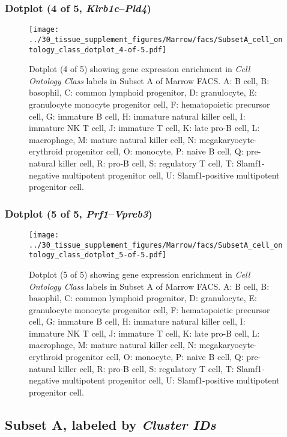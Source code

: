 \subsubsection{Dotplot (4 of 5, \emph{Klrb1c}--\emph{Pld4})}
\begin{figure}[h]
\centering
\texttt{[image: ../30\_tissue\_supplement\_figures/Marrow/facs/SubsetA\_cell\_ontology\_class\_dotplot\_4-of-5.pdf]}

\caption{ Dotplot (4 of 5)  showing gene expression enrichment in \emph{Cell Ontology Class} labels in Subset A of Marrow FACS. A: B cell, B: basophil, C: common lymphoid progenitor, D: granulocyte, E: granulocyte monocyte progenitor cell, F: hematopoietic precursor cell, G: immature B cell, H: immature natural killer cell, I: immature NK T cell, J: immature T cell, K: late pro-B cell, L: macrophage, M: mature natural killer cell, N: megakaryocyte-erythroid progenitor cell, O: monocyte, P: naive B cell, Q: pre-natural killer cell, R: pro-B cell, S: regulatory T cell, T: Slamf1-negative multipotent progenitor cell, U: Slamf1-positive multipotent progenitor cell.}
\end{figure}


\clearpage

\subsubsection{Dotplot (5 of 5, \emph{Prf1}--\emph{Vpreb3})}
\begin{figure}[h]
\centering
\texttt{[image: ../30\_tissue\_supplement\_figures/Marrow/facs/SubsetA\_cell\_ontology\_class\_dotplot\_5-of-5.pdf]}

\caption{ Dotplot (5 of 5)  showing gene expression enrichment in \emph{Cell Ontology Class} labels in Subset A of Marrow FACS. A: B cell, B: basophil, C: common lymphoid progenitor, D: granulocyte, E: granulocyte monocyte progenitor cell, F: hematopoietic precursor cell, G: immature B cell, H: immature natural killer cell, I: immature NK T cell, J: immature T cell, K: late pro-B cell, L: macrophage, M: mature natural killer cell, N: megakaryocyte-erythroid progenitor cell, O: monocyte, P: naive B cell, Q: pre-natural killer cell, R: pro-B cell, S: regulatory T cell, T: Slamf1-negative multipotent progenitor cell, U: Slamf1-positive multipotent progenitor cell.}
\end{figure}


\clearpage

\subsection{Subset A, labeled by \emph{Cluster IDs}}
